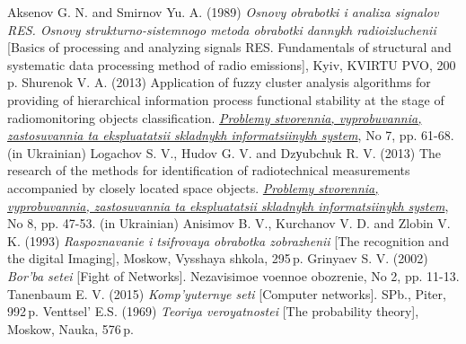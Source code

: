 \begin{thebibliography}{9}\footnotesize

 Aksenov G. N. and Smirnov Yu. A. (1989) \textit{Osnovy obrabotki i analiza signalov RES. Osnovy strukturno-sistemnogo metoda obrabotki dannykh radioizluchenii} [Basics of processing and analyzing signals RES. Fundamentals of structural and systematic data processing method of radio emissions], Kyiv, KVIRTU PVO, 200\,p.
 Shurenok V. A.  (2013) Application of fuzzy cluster analysis algorithms for providing of hierarchical information process functional stability at the stage of radiomonitoring objects classification. \href{http://nbuv.gov.ua/UJRN/Psvz_2013_7_9}{\textit{Problemy stvorennia, vyprobuvannia, zastosuvannia ta ekspluatatsii skladnykh informatsiinykh system}}, No 7, pp. 61-68. (in Ukrainian) 
 Logachov S. V., Hudov G. V. and Dzуubchuk R. V. (2013) The  research  of  the  methods  for  identification  of radiotechnical measurements accompanied by closely located space objects. \href{http://nbuv.gov.ua/UJRN/Psvz_2013_8_8}{\textit{Problemy stvorennia, vyprobuvannia, zastosuvannia ta ekspluatatsii skladnykh informatsiinykh system}}, No 8, pp. 47-53. (in Ukrainian)  
 Anisimov B. V., Kurchanov V. D. and Zlobin V. K. (1993) \textit{Raspoznavanie i tsifrovaya obrabotka zobrazhenii} [The recognition and the digital Imaging],  Moskow, Vysshaya shkola, 295\,p. 
 Grinyaev S. V. (2002) \textit{Bor'ba setei} [Fight of Networks]. Nezavisimoe voennoe obozrenie, No 2, pp. 11-13.
 Tanenbaum E. V. (2015) \textit{Komp'yuternye seti} [Computer networks]. SPb., Piter, 992\,p.
 Venttsel' E.S. (1969) \textit{Teoriya veroyatnostei} [The probability theory], Moskow, Nauka, 576\,p.

\end{thebibliography}

%